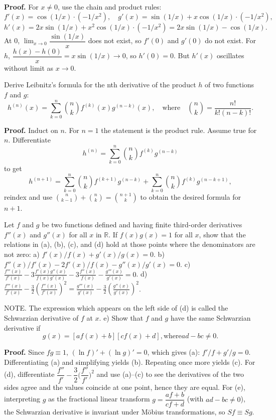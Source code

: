 \noindent\textbf{Proof.}
For $x\ne 0$, use the chain and product rules:
\[f'(x)=\cos(1/x)\cdot(-1/x^2),\quad g'(x)=\sin(1/x)+x\cos(1/x)\cdot(-1/x^2),\]
\[h'(x)=2x\sin(1/x)+x^2\cos(1/x)\cdot(-1/x^2)=2x\sin(1/x)-\cos(1/x).\]
At $0$, $\lim_{x\to 0}\dfrac{\sin(1/x)}{x}$ does not exist, so $f'(0)$ and $g'(0)$ do not exist. For $h$, $\dfrac{h(x)-h(0)}{x}=x\sin(1/x)\to 0$, so $h'(0)=0$. But $h'(x)$ oscillates without limit as $x\to 0$.

\begin{problembox}
Derive Leibnitz's formula for the nth derivative of the product \( h \) of two functions \( f \) and \( g \):
\[ h^{(n)}(x) = \sum_{k=0}^{n} \binom{n}{k} f^{(k)}(x)g^{(n-k)}(x), \quad \text{where} \quad \binom{n}{k} = \frac{n!}{k!(n-k)!}. \]
\end{problembox}

\noindent\textbf{Proof.}
Induct on $n$. For $n=1$ the statement is the product rule. Assume true for $n$. Differentiate
\[h^{(n)}=\sum_{k=0}^n\binom{n}{k}f^{(k)}g^{(n-k)}\]
to get
\[h^{(n+1)}=\sum_{k=0}^n\binom{n}{k}f^{(k+1)}g^{(n-k)}+\sum_{k=0}^n\binom{n}{k}f^{(k)}g^{(n-k+1)},\]
reindex and use $\binom{n}{k-1}+\binom{n}{k}=\binom{n+1}{k}$ to obtain the desired formula for $n+1$.

\begin{problembox}
Let \( f \) and \( g \) be two functions defined and having finite third-order derivatives \( f''(x) \) and \( g''(x) \) for all \( x \) in \( \mathbb{R} \). If \( f(x)g(x) = 1 \) for all \( x \), show that the relations in (a), (b), (c), and (d) hold at those points where the denominators are not zero:
a) \( f'(x)/f(x) + g'(x)/g(x) = 0 \).
b) \( f''(x)/f'(x) - 2f'(x)/f(x) - g''(x)/g'(x) = 0 \).
c) \( \frac{f'''(x)}{f'(x)} - 3\frac{f'(x)g''(x)}{f(x)g'(x)} - 3\frac{f''(x)}{f(x)} - \frac{g'''(x)}{g'(x)} = 0 \).
d) \( \frac{f'''(x)}{f'(x)} - \frac{3}{2}\left(\frac{f''(x)}{f'(x)}\right)^2 = \frac{g'''(x)}{g'(x)} - \frac{3}{2}\left(\frac{g''(x)}{g'(x)}\right)^2 \).

NOTE. The expression which appears on the left side of (d) is called the Schwarzian derivative of \( f \) at \( x \).
e) Show that \( f \) and \( g \) have the same Schwarzian derivative if
\[ g(x) = [af(x) + b][cf(x) + d], \text{where} ad - bc \neq 0. \]
\end{problembox}

\noindent\textbf{Proof.}
Since $fg\equiv 1$, $(\ln f)'+(\ln g)'=0$, which gives (a): $f'/f+g'/g=0$. Differentiating (a) and simplifying yields (b). Repeating once more yields (c). For (d), differentiate $\dfrac{f''}{f'}-\dfrac{3}{2}\Big(\dfrac{f''}{f'}\Big)^{\!2}$ and use (a)–(c) to see the derivatives of the two sides agree and the values coincide at one point, hence they are equal. For (e), interpreting $g$ as the fractional linear transform $g=\dfrac{af+b}{cf+d}$ (with $ad-bc\ne 0$), the Schwarzian derivative is invariant under Möbius transformations, so $Sf\equiv Sg$.

